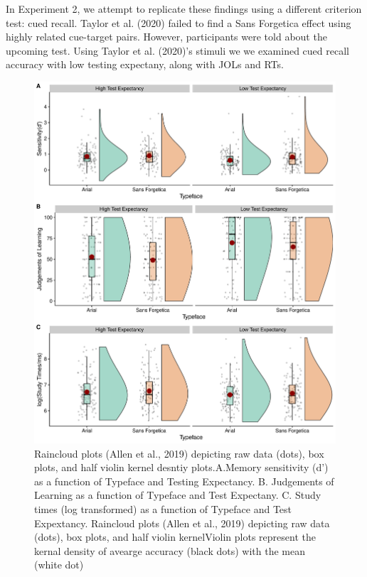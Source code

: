 \documentclass[
  english,
  jou]{apa6}
\begin{document}
In Experiment 2, we attempt to replicate these findings using a different criterion test: cued recall. Taylor et al. (2020) failed to find a Sans Forgetica effect using highly related cue-target pairs. However, participants were told about the upcoming test. Using Taylor et al. (2020)'s stimuli we we examined cued recall accuracy with low testing expectany, along with JOLs and RTs.

\begin{figure}

{\centering \includegraphics{Testing_Expectancy_SF_files/figure-latex/unnamed-chunk-15-1} 

}

\caption{Raincloud plots (Allen et al., 2019) depicting raw data (dots), box plots, and half violin kernel desntiy plots.A.Memory sensitivity (d') as a function of Typeface and Testing Expectancy. B. Judgements of Learning as a function of Typeface and Test Expectany. C. Study times (log transformed) as a function of Typeface and Test Expextancy. Raincloud plots (Allen et al., 2019) depicting raw data (dots), box plots, and half violin kernelViolin plots represent the kernal density of avearge accuracy (black dots) with the mean (white dot)}\label{fig:unnamed-chunk-15}
\end{figure}
\end{document}
